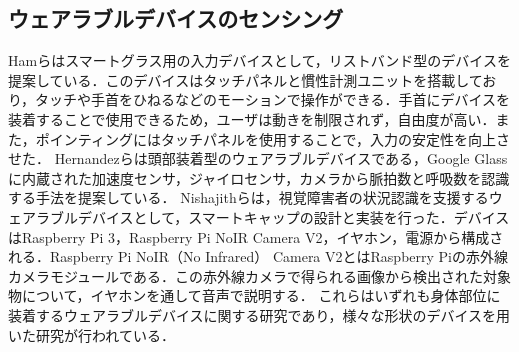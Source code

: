 \documentclass[Japanese,noauthor]{dicomopapers}
\begin{document}
\subsection{ウェアラブルデバイスのセンシング}
Hamら\cite{smart_wristband}はスマートグラス用の入力デバイスとして，リストバンド型のデバイスを提案している．このデバイスはタッチパネルと慣性計測ユニットを搭載しており，タッチや手首をひねるなどのモーションで操作ができる．手首にデバイスを装着することで使用できるため，ユーザは動きを制限されず，自由度が高い．また，ポインティングにはタッチパネルを使用することで，入力の安定性を向上させた．
Hernandezら\cite{bioglass}は頭部装着型のウェアラブルデバイスである，Google Glassに内蔵された加速度センサ，ジャイロセンサ，カメラから脈拍数と呼吸数を認識する手法を提案している．
Nishajithら\cite{smart_cap}は，視覚障害者の状況認識を支援するウェアラブルデバイスとして，スマートキャップの設計と実装を行った．デバイスはRaspberry Pi 3，Raspberry Pi NoIR Camera V2，イヤホン，電源から構成される．Raspberry Pi NoIR（No Infrared） Camera V2とはRaspberry Piの赤外線カメラモジュールである．この赤外線カメラで得られる画像から検出された対象物について，イヤホンを通して音声で説明する．
これらはいずれも身体部位に装着するウェアラブルデバイスに関する研究であり，様々な形状のデバイスを用いた研究が行われている．
\par
\end{document}
